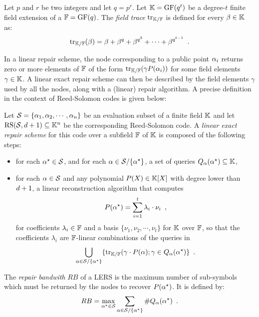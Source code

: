 \documentclass{llncs}
\begin{document}
\begin{definition}
Let $p$ and $r$ be two integers and let $q=p^r$. Let $\Field=\GF(q^t)$ be a degree-$t$ finite field extension of a $\FField=\GF(q)$. The {\em field trace} $\myTrace$ is defined for every $\beta \in \Field$ as:
\begin{equation}\label{equ:trace}
\myTrace(\beta) = \beta + \beta^q + \beta^{q^2} + \cdots + \beta^{q^{t-1}} \enspace .
\end{equation}
\end{definition}

In a linear repair scheme, the node corresponding to a public point $\pubElt$ returns zero or more elements of $\FField$ of the form $\myTrace(\gamma P(\pubElt))$ for some field elements $\gamma \in \Field$. A linear exact repair scheme can then be described by the field elements $\gamma$ used by all the nodes, along with a (linear) repair algorithm. A precise definition in the context of Reed-Solomon codes is given below:

\begin{definition}\label{def:LERS}
Let $\pubSet = \{\pubElt[1],\pubElt[2],\cdots,\pubElt[\nbShares]\}$ be an evaluation subset of a finite field $\Field$ and let $\RS[\pubSet, \order + 1]\subseteq \Field^{\nbShares}$ be the corresponding Reed-Solomon code. A {\em linear exact repair scheme} for this code over a subfield $\FField$ of $\Field$ is composed of the following steps:
\begin{itemize}
\item for each $\pubEltStar\in \pubSet$, and for each $\pubEltNoIndex\in \pubSet \slash \{\pubEltStar\}$, a set of queries $Q_{\pubEltNoIndex}(\pubEltStar)\subseteq \Field$,
\item for each $\pubEltNoIndex \in \pubSet$ and any polynomial $P(X)\in \Field[X]$ with degree lower than $\order +1$, a linear reconstruction algorithm that computes 
$$
P(\pubEltStar) = \sum_{i=1}^t\lambda_i \cdot \nu_i \enspace ,
$$
for coefficients $\lambda_i\in \FField$ and a basis $\{\nu_1,\nu_2,\cdots,\nu_t\}$ for $\Field$ over $\FField$, so that the coefficients $\lambda_i$ are $\FField$-linear combinations of the queries in 
$$
\bigcup_{\pubEltNoIndex \in \pubSet \slash \{\pubEltStar\}}\{\myTrace(\gamma\cdot P(\pubEltNoIndex); \gamma \in Q_{\pubEltNoIndex}(\pubEltStar)\} \enspace .
$$
\end{itemize}
\end{definition}

The {\em repair bandwith} $RB$ of a LERS is the maximum number of sub-symbols which must be returned by the nodes to recover $P(\pubEltStar)$. It is defined by:
$$
RB = \max_{\pubEltStar \in \pubSet} \sum_{\pubEltNoIndex \in \pubSet \slash \{\pubEltStar\}} \# Q_{\pubEltNoIndex}(\pubEltStar) \enspace .
$$
\end{document}
